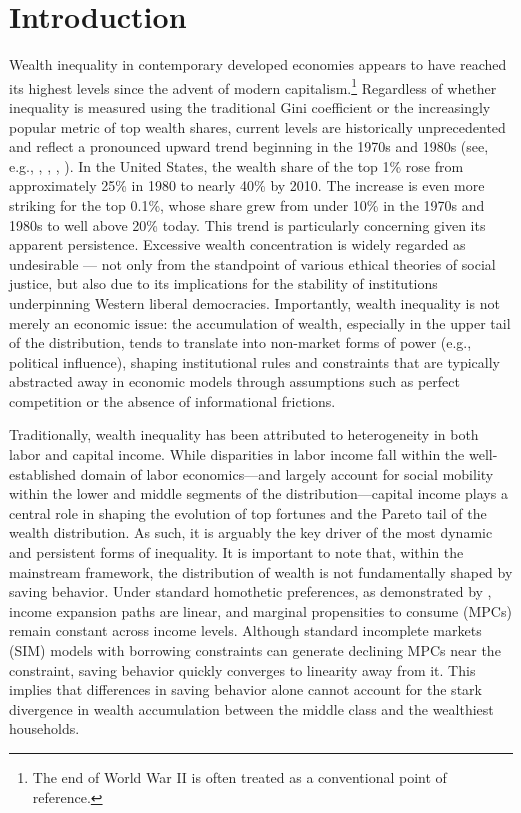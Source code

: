 \documentclass[12pt]{article}
\begin{document}
\newpage
\tableofcontents
\newpage
\section{Introduction}
\label{sec:introduction}

Wealth inequality in contemporary developed economies appears to have reached its highest levels since the advent of modern capitalism.\footnote{The end of World War II is often treated as a conventional point of reference.} Regardless of whether inequality is measured using the traditional Gini coefficient or the increasingly popular metric of top wealth shares, current levels are historically unprecedented and reflect a pronounced upward trend beginning in the 1970s and 1980s (see, e.g., \textcite{piketty2014}, \textcite{piketty2020}, \textcite{saez2016}, \textcite{lakner2013}). In the United States, the wealth share of the top 1\% rose from approximately 25\% in 1980 to nearly 40\% by 2010. The increase is even more striking for the top 0.1\%, whose share grew from under 10\% in the 1970s and 1980s to well above 20\% today. This trend is particularly concerning given its apparent persistence. Excessive wealth concentration is widely regarded as undesirable — not only from the standpoint of various ethical theories of social justice, but also due to its implications for the stability of institutions underpinning Western liberal democracies. Importantly, wealth inequality is not merely an economic issue: the accumulation of wealth, especially in the upper tail of the distribution, tends to translate into non-market forms of power (e.g., political influence), shaping institutional rules and constraints that are typically abstracted away in economic models through assumptions such as perfect competition or the absence of informational frictions.

Traditionally, wealth inequality has been attributed to heterogeneity in both labor and capital income. While disparities in labor income fall within the well-established domain of labor economics—and largely account for social mobility within the lower and middle segments of the distribution—capital income plays a central role in shaping the evolution of top fortunes and the Pareto tail of the wealth distribution. As such, it is arguably the key driver of the most dynamic and persistent forms of inequality. It is important to note that, within the mainstream framework, the distribution of wealth is not fundamentally shaped by saving behavior. Under standard homothetic preferences, as demonstrated by \textcite{gorman1953}, income expansion paths are linear, and marginal propensities to consume (MPCs) remain constant across income levels. Although standard incomplete markets (SIM) models with borrowing constraints can generate declining MPCs near the constraint, saving behavior quickly converges to linearity away from it. This implies that differences in saving behavior alone cannot account for the stark divergence in wealth accumulation between the middle class and the wealthiest households.
\end{document}

